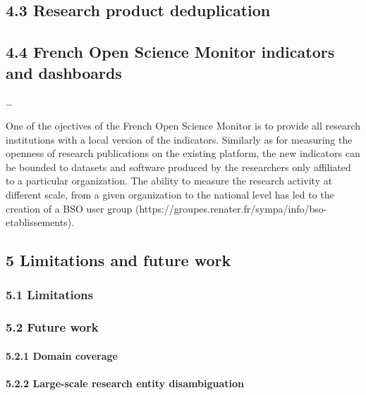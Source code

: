 \documentclass[
]{article}
\begin{document}
\hypertarget{research-product-deduplication}{%
\subsection{4.3 Research product
deduplication}\label{research-product-deduplication}}

\hypertarget{french-open-science-monitor-indicators-and-dashboards}{%
\subsection{4.4 French Open Science Monitor indicators and
dashboards}\label{french-open-science-monitor-indicators-and-dashboards}}

\ldots{}

One of the ojectives of the French Open Science Monitor is to provide
all research institutions with a local version of the indicators.
Similarly as for measuring the openness of research publications on the
existing platform, the new indicators can be bounded to datasets and
software produced by the researchers only affiliated to a particular
organization. The ability to measure the research activity at different
scale, from a given organization to the national level has led to the
creation of a BSO user group
(https://groupes.renater.fr/sympa/info/bso-etablissements).

\hypertarget{limitations-and-future-work}{%
\subsection{5 Limitations and future
work}\label{limitations-and-future-work}}

\hypertarget{limitations}{%
\subsubsection{5.1 Limitations}\label{limitations}}

\hypertarget{future-work}{%
\subsubsection{5.2 Future work}\label{future-work}}

\hypertarget{domain-coverage}{%
\paragraph{5.2.1 Domain coverage}\label{domain-coverage}}

\hypertarget{large-scale-research-entity-disambiguation}{%
\paragraph{5.2.2 Large-scale research entity
disambiguation}\label{large-scale-research-entity-disambiguation}}
\end{document}
